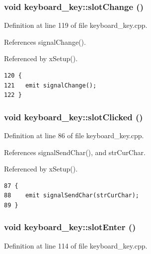 \subsubsection{\setlength{\rightskip}{0pt plus 5cm}void keyboard\_\-key::slot\-Change ()\hspace{0.3cm}{\tt  [slot]}}\label{classkeyboard__key_keyboard__keyi5}




Definition at line 119 of file keyboard\_\-key.cpp.

References signal\-Change().

Referenced by x\-Setup().



\footnotesize\begin{verbatim}120 {
121   emit signalChange();
122 }
\end{verbatim}\normalsize 
{}
\subsubsection{\setlength{\rightskip}{0pt plus 5cm}void keyboard\_\-key::slot\-Clicked ()\hspace{0.3cm}{\tt  [slot]}}\label{classkeyboard__key_keyboard__keyi1}




Definition at line 86 of file keyboard\_\-key.cpp.

References signal\-Send\-Char(), and str\-Cur\-Char.

Referenced by x\-Setup().



\footnotesize\begin{verbatim}87 {
88    emit signalSendChar(strCurChar);
89 }
\end{verbatim}\normalsize 
{}
\subsubsection{\setlength{\rightskip}{0pt plus 5cm}void keyboard\_\-key::slot\-Enter ()\hspace{0.3cm}{\tt  [slot]}}\label{classkeyboard__key_keyboard__keyi4}




Definition at line 114 of file keyboard\_\-key.cpp.

